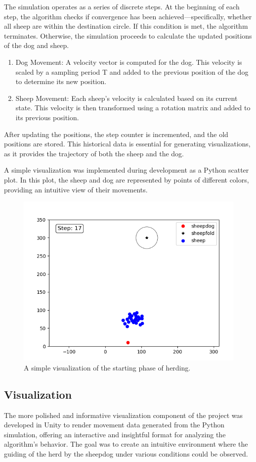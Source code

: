 \documentclass[9pt]{pnas-new}
\begin{document}
The simulation operates as a series of discrete steps. At the beginning of each step,
the algorithm checks if convergence has been achieved—specifically, whether all sheep are within
the destination circle. If this condition is met, the algorithm terminates. Otherwise,
the simulation proceeds to calculate the updated positions of the dog and sheep.

\begin{enumerate}
    \item Dog Movement:
    A velocity vector is computed for the dog. This velocity is scaled by a sampling period T and added to the previous position of the dog to determine its new position.
    \item Sheep Movement:
    Each sheep’s velocity is calculated based on its current state. This velocity is then transformed using a rotation matrix and added to its previous position.
\end{enumerate}

After updating the positions, the step counter is incremented, and the old positions are stored.
This historical data is essential for generating visualizations, as it provides the trajectory
of both the sheep and the dog.

A simple visualization was implemented during development as a Python scatter plot.
In this plot, the sheep and dog are represented by points of different colors,
providing an intuitive view of their movements. 

\begin{figure}[H]
	\centering
	\includegraphics[width=.5\linewidth]{fig/step17.PNG}
	\caption{A simple visualization of the starting phase of herding.}
	\label{fig:start}
\end{figure}

\subsection*{Visualization} \label{vis}
The more polished and informative visualization component of the project was developed in Unity to render movement data generated from the Python simulation, offering an interactive and insightful format for analyzing the algorithm's behavior. The goal was to create an intuitive environment where the guiding of the herd by the sheepdog under various conditions could be observed.
\end{document}
